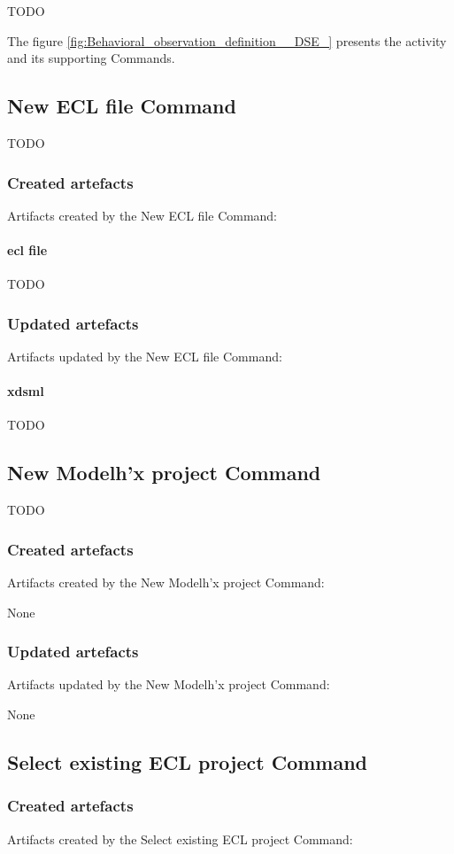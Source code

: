 \documentclass{gemoc} %
\begin{document}
TODO

The figure \ref{fig:Behavioral_observation_definition__DSE_} presents the activity and its supporting Commands.

\subsection{New ECL file Command}
TODO
\subsubsection{Created artefacts}
Artifacts created by the New ECL file Command:
\paragraph{ecl file} 
TODO
\subsubsection{Updated artefacts}
Artifacts updated by the New ECL file Command:
\paragraph{xdsml} 
TODO

\subsection{New Modelh'x project Command}
TODO
\subsubsection{Created artefacts}
Artifacts created by the New Modelh'x project Command:

	None
\subsubsection{Updated artefacts}
Artifacts updated by the New Modelh'x project Command:

	None

\subsection{Select existing ECL project Command}

\subsubsection{Created artefacts}
Artifacts created by the Select existing ECL project Command:
\end{document}
